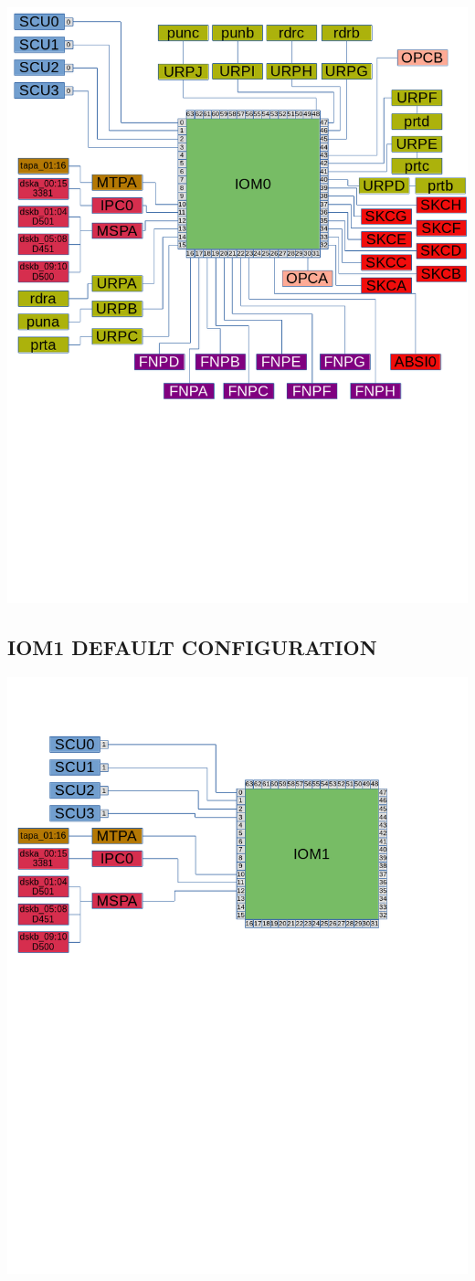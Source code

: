 \noindent\includegraphics[width=\textwidth,height=\textheight,keepaspectratio]{DefaultCablingDiagram-IOM0.png}

\subsection[IOM1 Default Configuration]{IOM1 DEFAULT CONFIGURATION}

\noindent\includegraphics[width=\textwidth,height=\textheight,keepaspectratio]{DefaultCablingDiagram-IOM1.png}
